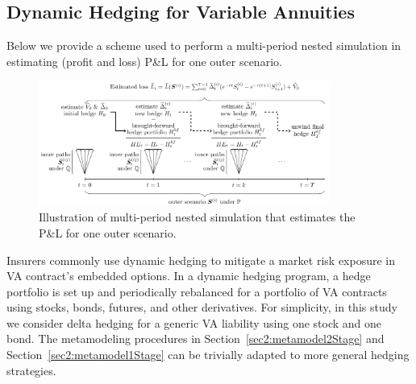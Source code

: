 \subsection{Dynamic Hedging for Variable Annuities}\label{subsec:dynamicHedge}

Below we provide a scheme used to perform a multi-period nested simulation in estimating (profit and loss) P\&L for one outer scenario.

\begin{figure}[ht]
    \centering
    \includegraphics[width=0.85\textwidth]{./project2/figures/sns.pdf}
    \caption{Illustration of multi-period nested simulation that estimates the P\&L for one outer scenario.}
    \label{fig2:illustration}
\end{figure}

Insurers commonly use dynamic hedging to mitigate a market risk exposure in VA contract's embedded options.
In a dynamic hedging program, a hedge portfolio is set up and periodically rebalanced for a portfolio of VA contracts using stocks, bonds, futures, and other derivatives.
For simplicity, in this study we consider delta hedging for a generic VA liability using one stock and one bond.
The metamodeling procedures in Section~\ref{sec2:metamodel2Stage} and Section~\ref{sec2:metamodel1Stage} can be trivially adapted to more general hedging strategies.

